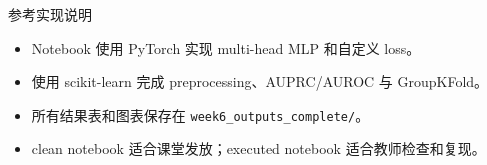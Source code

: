 \documentclass[aspectratio=169,11pt]{beamer}
\begin{document}
\begin{frame}{参考实现说明}
\begin{itemize}
  \item Notebook 使用 PyTorch 实现 multi-head MLP 和自定义 loss。
  \item 使用 scikit-learn 完成 preprocessing、AUPRC/AUROC 与 GroupKFold。
  \item 所有结果表和图表保存在 \texttt{week6\_outputs\_complete/}。
  \item clean notebook 适合课堂发放；executed notebook 适合教师检查和复现。
\end{itemize}
\end{frame}
\end{document}
